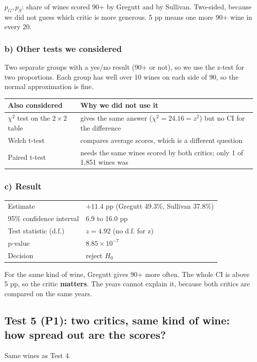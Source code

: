 \documentclass[10pt,a4paper,twocolumn]{article}
\begin{document}
$p_G, p_S$: share of wines scored 90+ by Gregutt and by Sullivan. Two-sided, because we did not guess which critic is
more generous. 5 pp means one more 90+ wine in every 20.

\subsubsection*{b) Other tests we considered}
Two separate groups with a yes/no result (90+ or not), so we use the z-test for two proportions. Each group has well
over 10 wines on each side of 90, so the normal approximation is fine.

{\footnotesize
\begin{tabularx}{\columnwidth}{@{}P{23mm}L@{}}
\toprule
\textbf{Also considered} & \textbf{Why we did not use it}\\
\midrule
$\chi^2$ test on the $2 \times 2$ table & gives the same answer ($\chi^2 = 24.16 = z^2$) but no CI for the
difference\\
Welch t-test & compares average scores, which is a different question\\
Paired t-test & needs the same wines scored by both critics; only 1 of 1,851 wines was\\
\bottomrule
\end{tabularx}\par}

\subsubsection*{c) Result}
{\small
\begin{tabularx}{\columnwidth}{@{}HL@{}}
\toprule
Estimate & $+11.4$ pp (Gregutt 49.3\%, Sullivan 37.8\%)\\
95\% confidence interval & 6.9 to 16.0 pp\\
Test statistic (d.f.) & $z = 4.92$ (no d.f. for z)\\
p-value & $8.85 \times 10^{-7}$\\
Decision & reject $H_0$\\
\bottomrule
\end{tabularx}\par}

For the same kind of wine, Gregutt gives 90+ more often. The whole CI is above 5 pp, so the critic \textbf{matters}.
The years cannot explain it, because both critics are compared on the same years.

\subsection*{Test 5 (P1): two critics, same kind of wine: how spread out are the scores?}
Same wines as Test 4.
\end{document}
